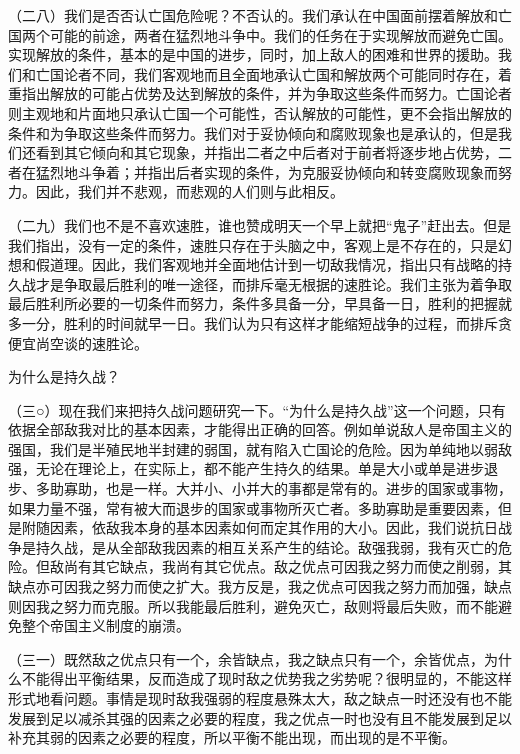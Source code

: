 \documentclass[UTF8, 12pt, a4paper]{ctexrep}
\begin{document}
（二八）我们是否否认亡国危险呢？不否认的。我们承认在中国面前摆着解放和亡国两个可能的前途，两者在猛烈地斗争中。我们的任务在于实现解放而避免亡国。实现解放的条件，基本的是中国的进步，同时，加上敌人的困难和世界的援助。我们和亡国论者不同，我们客观地而且全面地承认亡国和解放两个可能同时存在，着重指出解放的可能占优势及达到解放的条件，并为争取这些条件而努力。亡国论者则主观地和片面地只承认亡国一个可能性，否认解放的可能性，更不会指出解放的条件和为争取这些条件而努力。我们对于妥协倾向和腐败现象也是承认的，但是我们还看到其它倾向和其它现象，并指出二者之中后者对于前者将逐步地占优势，二者在猛烈地斗争着；并指出后者实现的条件，为克服妥协倾向和转变腐败现象而努力。因此，我们并不悲观，而悲观的人们则与此相反。

（二九）我们也不是不喜欢速胜，谁也赞成明天一个早上就把“鬼子”赶出去。但是我们指出，没有一定的条件，速胜只存在于头脑之中，客观上是不存在的，只是幻想和假道理。因此，我们客观地并全面地估计到一切敌我情况，指出只有战略的持久战才是争取最后胜利的唯一途径，而排斥毫无根据的速胜论。我们主张为着争取最后胜利所必要的一切条件而努力，条件多具备一分，早具备一日，胜利的把握就多一分，胜利的时间就早一日。我们认为只有这样才能缩短战争的过程，而排斥贪便宜尚空谈的速胜论。

为什么是持久战？

（三○）现在我们来把持久战问题研究一下。“为什么是持久战”这一个问题，只有依据全部敌我对比的基本因素，才能得出正确的回答。例如单说敌人是帝国主义的强国，我们是半殖民地半封建的弱国，就有陷入亡国论的危险。因为单纯地以弱敌强，无论在理论上，在实际上，都不能产生持久的结果。单是大小或单是进步退步、多助寡助，也是一样。大并小、小并大的事都是常有的。进步的国家或事物，如果力量不强，常有被大而退步的国家或事物所灭亡者。多助寡助是重要因素，但是附随因素，依敌我本身的基本因素如何而定其作用的大小。因此，我们说抗日战争是持久战，是从全部敌我因素的相互关系产生的结论。敌强我弱，我有灭亡的危险。但敌尚有其它缺点，我尚有其它优点。敌之优点可因我之努力而使之削弱，其缺点亦可因我之努力而使之扩大。我方反是，我之优点可因我之努力而加强，缺点则因我之努力而克服。所以我能最后胜利，避免灭亡，敌则将最后失败，而不能避免整个帝国主义制度的崩溃。

（三一）既然敌之优点只有一个，余皆缺点，我之缺点只有一个，余皆优点，为什么不能得出平衡结果，反而造成了现时敌之优势我之劣势呢？很明显的，不能这样形式地看问题。事情是现时敌我强弱的程度悬殊太大，敌之缺点一时还没有也不能发展到足以减杀其强的因素之必要的程度，我之优点一时也没有且不能发展到足以补充其弱的因素之必要的程度，所以平衡不能出现，而出现的是不平衡。
\end{document}

